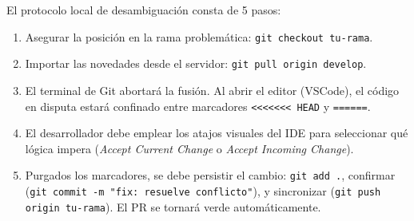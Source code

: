\documentclass[12pt, a4paper]{article}
\begin{document}
El protocolo local de desambiguación consta de 5 pasos:
\begin{enumerate}
    \item Asegurar la posición en la rama problemática: \texttt{git checkout tu-rama}.
    \item Importar las novedades desde el servidor: \texttt{git pull origin develop}.
    \item El terminal de Git abortará la fusión. Al abrir el editor (VSCode), el código en disputa estará confinado entre marcadores \texttt{<<<<<<< HEAD} y \texttt{======}.
    \item El desarrollador debe emplear los atajos visuales del IDE para seleccionar qué lógica impera (\textit{Accept Current Change} o \textit{Accept Incoming Change}).
    \item Purgados los marcadores, se debe persistir el cambio: \texttt{git add .}, confirmar (\texttt{git commit -m "fix: resuelve conflicto"}), y sincronizar (\texttt{git push origin tu-rama}). El PR se tornará verde automáticamente.
\end{enumerate}
\end{document}
